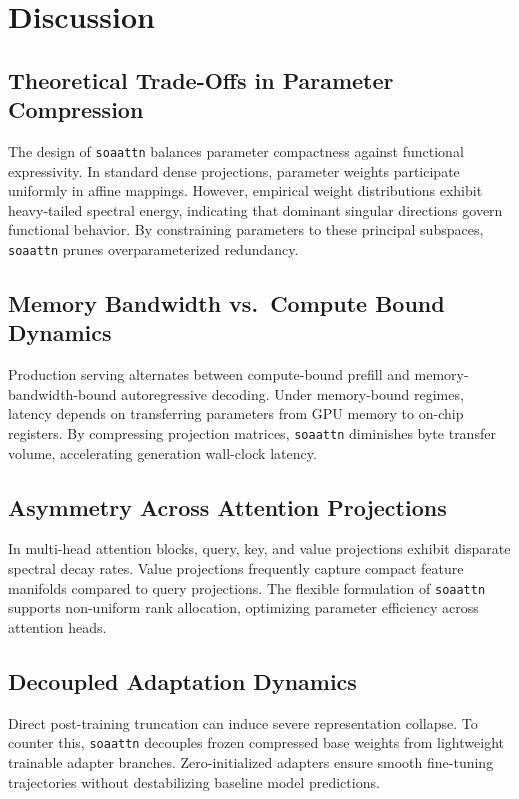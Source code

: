 \section{Discussion}

\subsection{Theoretical Trade-Offs in Parameter Compression}
The design of \texttt{soaattn} balances parameter compactness against functional expressivity. In standard dense projections, parameter weights participate uniformly in affine mappings. However, empirical weight distributions exhibit heavy-tailed spectral energy, indicating that dominant singular directions govern functional behavior. By constraining parameters to these principal subspaces, \texttt{soaattn} prunes overparameterized redundancy.

\subsection{Memory Bandwidth vs.\ Compute Bound Dynamics}
Production serving alternates between compute-bound prefill and memory-bandwidth-bound autoregressive decoding. Under memory-bound regimes, latency depends on transferring parameters from GPU memory to on-chip registers. By compressing projection matrices, \texttt{soaattn} diminishes byte transfer volume, accelerating generation wall-clock latency.

\subsection{Asymmetry Across Attention Projections}
In multi-head attention blocks, query, key, and value projections exhibit disparate spectral decay rates. Value projections frequently capture compact feature manifolds compared to query projections. The flexible formulation of \texttt{soaattn} supports non-uniform rank allocation, optimizing parameter efficiency across attention heads.

\subsection{Decoupled Adaptation Dynamics}
Direct post-training truncation can induce severe representation collapse. To counter this, \texttt{soaattn} decouples frozen compressed base weights from lightweight trainable adapter branches. Zero-initialized adapters ensure smooth fine-tuning trajectories without destabilizing baseline model predictions.

